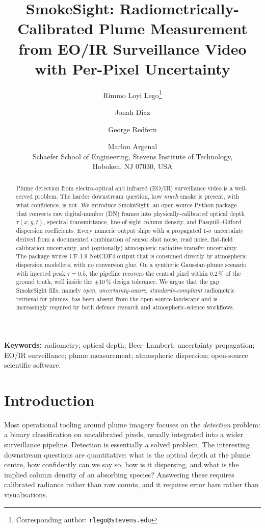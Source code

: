 \documentclass[11pt, a4paper]{article}
\title{\textbf{SmokeSight}: Radiometrically-Calibrated Plume Measurement
       from EO/IR Surveillance Video with Per-Pixel Uncertainty}
\author{
  Rimmo Loyi Lego\thanks{Corresponding author: \texttt{rlego@stevens.edu}}
  \and Jonah Diaz
  \and George Redfern
  \and Marlon Argenal \\
  \small Schaefer School of Engineering, Stevens Institute of Technology,\\
  \small Hoboken, NJ 07030, USA
}
\date{}
\begin{document}
\maketitle

\begin{abstract}
\noindent
Plume detection from electro-optical and infrared (EO/IR) surveillance
video is a well-served problem. The harder downstream question, how
\emph{much} smoke is present, with what confidence, is not.
We introduce SmokeSight, an open-source Python package that converts raw
digital-number (DN) frames into physically-calibrated optical depth
$\tau(x, y, t)$, spectral transmittance, line-of-sight column density,
and Pasquill--Gifford dispersion coefficients. Every numeric output
ships with a propagated 1-$\sigma$ uncertainty derived from a documented
combination of sensor shot noise, read noise, flat-field calibration
uncertainty, and (optionally) atmospheric radiative transfer
uncertainty. The package writes CF-1.9 NetCDF4 output that is consumed
directly by atmospheric dispersion modellers, with no conversion glue.
On a synthetic Gaussian-plume scenario with injected peak $\tau = 0.5$,
the pipeline recovers the central pixel within 0.2\,\% of the ground
truth, well inside the $\pm 10\,\%$ design tolerance. We argue that
the gap SmokeSight fills, namely \emph{open}, \emph{uncertainty-aware},
\emph{standards-compliant} radiometric retrieval for plumes, has been
absent from the open-source landscape and is increasingly required by
both defence research and atmospheric-science workflows.
\end{abstract}

\noindent\textbf{Keywords:} radiometry; optical depth; Beer--Lambert;
uncertainty propagation; EO/IR surveillance; plume measurement;
atmospheric dispersion; open-source scientific software.

\section{Introduction}
\label{sec:intro}

Most operational tooling around plume imagery focuses on the
\emph{detection} problem: a binary classification on uncalibrated pixels,
usually integrated into a wider surveillance pipeline.
Detection is essentially a solved problem. The interesting downstream
questions are quantitative: what is the optical depth at the plume centre,
how confidently can we say so, how is it dispersing, and what is the
implied column density of an absorbing species? Answering these requires
calibrated radiance rather than raw counts, and it requires error bars
rather than visualisations.
\end{document}
